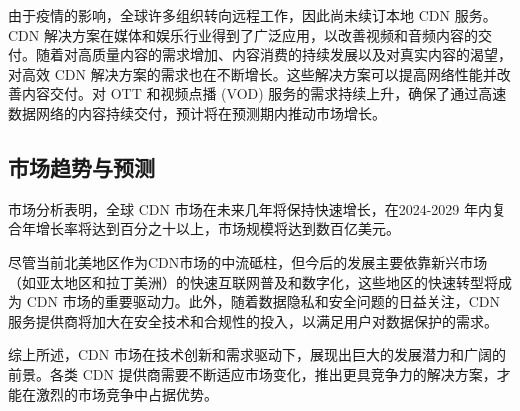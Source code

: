 由于疫情的影响，全球许多组织转向远程工作，因此尚未续订本地 CDN 服务。CDN 解决方案在媒体和娱乐行业得到了广泛应用，以改善视频和音频内容的交付。随着对高质量内容的需求增加、内容消费的持续发展以及对真实内容的渴望，对高效 CDN 解决方案的需求也在不断增长。这些解决方案可以提高网络性能并改善内容交付。对 OTT 和视频点播 (VOD) 服务的需求持续上升，确保了通过高速数据网络的内容持续交付，预计将在预测期内推动市场增长。
\cite{CDNfortunebusinessinsightsCD36:online}

\subsection{市场趋势与预测}

市场分析表明\cite{MordorIntelligence:online}\cite{JSTX202408012}，全球 CDN 市场在未来几年将保持快速增长，在2024-2029 年内复合年增长率将达到百分之十以上\cite{MordorIntelligence:online}\cite{ContentD60:online}，市场规模将达到数百亿美元。

尽管当前北美地区作为CDN市场的中流砥柱\cite{ContentD7:online}，但今后的发展主要依靠新兴市场（如亚太地区和拉丁美洲）的快速互联网普及和数字化，这些地区的快速转型将成为 CDN 市场的重要驱动力。此外，随着数据隐私和安全问题的日益关注，CDN 服务提供商将加大在安全技术和合规性的投入，以满足用户对数据保护的需求。

综上所述，CDN 市场在技术创新和需求驱动下，展现出巨大的发展潜力和广阔的前景。各类 CDN 提供商需要不断适应市场变化，推出更具竞争力的解决方案，才能在激烈的市场竞争中占据优势。